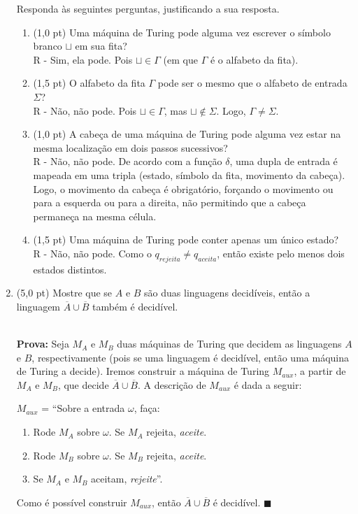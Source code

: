\documentclass[12pt,a4paper,oneside]{article}
\begin{document}
\begin{enumerate}
	 Responda às seguintes perguntas, justificando a sua resposta.
	\begin{enumerate}
		\item (1,0 pt) Uma máquina de Turing pode alguma vez escrever o símbolo branco $\sqcup$ em sua fita? \\
			{\color{verde}
				R - Sim, ela pode. Pois $\sqcup \in \Gamma$ (em que $\Gamma$ é o alfabeto da fita).
			}
		\item (1,5 pt) O alfabeto da fita $\Gamma$ pode ser o mesmo que o alfabeto de entrada $\Sigma$? \\
			{\color{verde}
				R - Não, não pode. Pois $\sqcup \in \Gamma$, mas $\sqcup \not\in \Sigma$. Logo, $\Gamma \not= \Sigma$.
			}
		\item (1,0 pt) A cabeça de uma máquina de Turing pode alguma vez estar na mesma localização em dois passos sucessivos?\\
			{\color{verde}
				R - Não, não pode. De acordo com a função $\delta$, uma dupla de entrada é mapeada em uma tripla (estado, símbolo da fita, movimento da cabeça). Logo, o movimento da cabeça é obrigatório, forçando o movimento ou para a esquerda ou para a direita, não permitindo que a cabeça permaneça na mesma célula.
			}
		\item (1,5 pt) Uma máquina de Turing pode conter apenas um único estado?\\
			{\color{verde}
				R - Não, não pode. Como o $q_{rejeita} \not= q_{aceita}$, então existe pelo menos dois estados distintos.
			}
	\end{enumerate}
	
	\item (5,0 pt) Mostre que se $A$ e $B$ são duas linguagens decidíveis, então a linguagem $\overline{A} \cup \overline{B}$ também é decidível.\\
			\\{\color{verde}	
				{\bf Prova:} Seja $M_A$ e $M_B$ duas máquinas de Turing que decidem as linguagens $A$ e $B$, respectivamente (pois se uma linguagem é decidível, então uma máquina de Turing a decide). Iremos construir a máquina de Turing $M_{aux}$, a partir de $M_A$ e $M_B$, que decide $\overline{A} \cup \overline{B}$. A descrição de $M_{aux}$ é dada a seguir:
			
			$M_{aux}$ = ``Sobre a entrada $\omega$, faça:
			\begin{enumerate}
				\item Rode $M_A$ sobre $\omega$. Se $M_A$ rejeita, {\it aceite}.
				\item Rode $M_B$ sobre $\omega$. Se $M_B$ rejeita, {\it aceite}.
				\item Se $M_A$ e $M_B$ aceitam, {\it rejeite}''.
			\end{enumerate}
			
			Como é possível construir $M_{aux}$, então $\overline{A} \cup \overline{B}$ é decidível. $\blacksquare$
			}

\end{enumerate}
\end{document}
